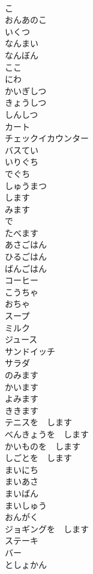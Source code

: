 \documentclass[8pt]{extreport}
\begin{document}
\begin{CJK}{UTF8}{min}
\\	こ		
\\	おんあのこ		
\\	いくつ		
\\	なんまい		
\\	なんぼん		
\\	ここ		
\\	にわ		
\\	かいぎしつ		
\\	きょうしつ		
\\	しんしつ		
\\	カート		
\\	チェックイカウンター		
\\	バスてい		
\\	いりぐち		
\\	でぐち		
\\	しゅうまつ		
\\	します		
\\	みます		
\\	で		
\\	たべます		
\\	あさごはん		
\\	ひるごはん		
\\	ばんごはん		
\\	コーヒー		
\\	こうちゃ		
\\	おちゃ		
\\	スープ		
\\	ミルク		
\\	ジュース		
\\	サンドイッチ		
\\	サラダ		
\\	のみます		
\\	かいます		
\\	よみます		
\\	ききます		
\\	テニスを　します		
\\	べんきょうを　します		
\\	かいものを　します		
\\	しごとを　します		
\\	まいにち		
\\	まいあさ		
\\	まいばん		
\\	まいしゅう		
\\	おんがく		
\\	ジョギングを　します		
\\	ステーキ		
\\	バー		
\\	としょかん		

\end{CJK}
\end{document}
